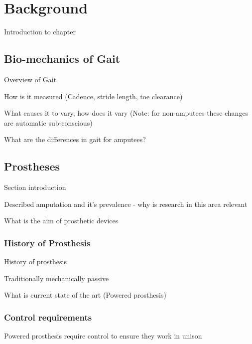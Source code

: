 \chapter{Background}
Introduction to chapter

\section{Bio-mechanics of Gait}
Overview of Gait 

How is it measured (Cadence, stride length, toe clearance)

What causes it to vary, how does it vary (Note: for non-amputees these changes are automatic sub-conscious)

What are the differences in gait for amputees?


\section{Prostheses}
Section introduction

Described amputation and it's prevalence - why is research in this area relevant 

What is the aim of prosthetic devices

\subsection{History of Prosthesis}
History of prosthesis

Traditionally mechanically passive

What is current state of the art (Powered prosthesis)

\subsection{Control requirements} %
Powered prosthesis require control to ensure they work in unison

